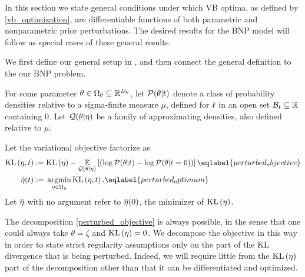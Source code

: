 In this section we state general conditions under which VB optima, as defined by
\eqref{vb_optimization}, are differentiable functions of both parametric and
nonparametric prior perturbations.  The desired results for the BNP model will
follow as special cases of these general results.

We first define our general setup in , and then connect
the general definition to the our BNP problem.

\begin{defn}
%
For some parameter $\theta \in \Omega_{\theta} \subseteq \mathbb{R}^{{D_{\theta}}}$, let
$\mathcal{P}(\theta \vert t)$ denote a class of probability densities relative to
a sigma-finite measure $\mu$, defined for $t$ in an open set $\mathcal{B}_t
\subseteq \mathbb{R}$ containing $0$.  Let $\mathcal{Q}(\theta \vert \eta)$ be a
family of approximating densities, also defined relative to $\mu$.

Let the variational objective factorize as
%
\begin{align}
%
\KL{\eta, \t} :={}&
    \KL{\eta} -
    \expect{\q(\theta \vert \eta)}
       {\left(\log \p(\theta \vert \t) - \log \p(\theta \vert \t=0)\right)}           \eqlabel{perturbed_objective}\\
\etaopt(\t) :={}& \argmin_{\eta \in \etadom} \KL{\eta, \t}.
    \eqlabel{perturbed_optimum}
%
\end{align}
%
Let $\hat\eta$ with no argument refer to $\hat\eta(0)$, the minimizer
of $\mathrm{KL}\left(\eta\right)$.
%
\end{defn}

The decomposition \eqref{perturbed_objective} is always possible, in the sense
that one could always take $\theta = \zeta$ and $\mathrm{KL}\left(\eta\right) = 0$.  We decompose
the objective in this way in order to state strict regularity assumptions only
on the part of the KL divergence that is being perturbed.  Indeed, we will
require little from the $\mathrm{KL}\left(\eta\right)$ part of the decomposition other than that it
can be differentiated and optimized.

